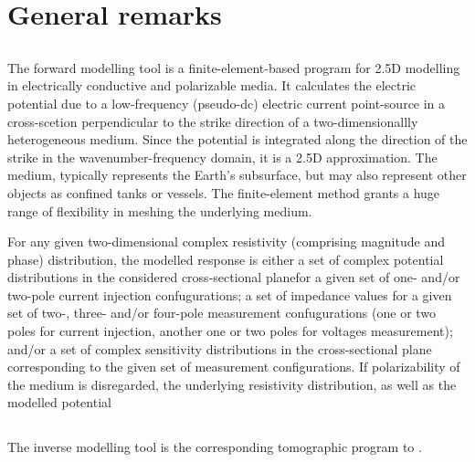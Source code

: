 \section{General remarks}\label{sect:intro_general}

\subsection{\crm}\label{sub:intro_crm}
The forward modelling tool \crm \index{\crm} is a finite-element-based program for 2.5D modelling in electrically conductive and polarizable media.
It calculates the electric potential due to a low-frequency (pseudo-dc) electric current point-source in a cross-scetion perpendicular to the strike direction of a two-dimensionallly heterogeneous medium.
Since the potential is integrated along the direction of the strike in the wavenumber-frequency domain, it is a 2.5D approximation.
The medium, typically represents the Earth's subsurface, but may also represent other objects as confined tanks or vessels.
The finite-element method grants a huge range of flexibility in meshing the underlying medium.

For any given two-dimensional complex resistivity (comprising magnitude and phase) distribution, the modelled response is either a set of complex potential distributions in the considered cross-sectional planefor a given set of one- and/or two-pole current injection confugurations; a set of impedance values for a given set of two-, three- and/or four-pole measurement confugurations (one or two poles for current injection, another one or two poles for voltages measurement); and/or a set of complex sensitivity distributions in the cross-sectional plane corresponding to the given set of measurement configurations.
If polarizability of the medium is disregarded, the underlying resistivity distribution, as well as the modelled potential


\subsection{\crt}\label{sub:intro_crt}
The inverse modelling tool \crt \index{\crt} is the corresponding tomographic program to \crm.

